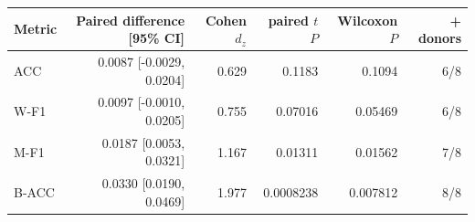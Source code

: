 \begin{tabular}{lrrrrr}
\toprule
Metric & Paired difference [95\% CI] & Cohen $d_z$ & paired $t$ $P$ & Wilcoxon $P$ & + donors \\
\midrule
ACC & 0.0087 [-0.0029, 0.0204] & 0.629 & 0.1183 & 0.1094 & 6/8 \\
W-F1 & 0.0097 [-0.0010, 0.0205] & 0.755 & 0.07016 & 0.05469 & 6/8 \\
M-F1 & 0.0187 [0.0053, 0.0321] & 1.167 & 0.01311 & 0.01562 & 7/8 \\
B-ACC & 0.0330 [0.0190, 0.0469] & 1.977 & 0.0008238 & 0.007812 & 8/8 \\
\bottomrule
\end{tabular}
